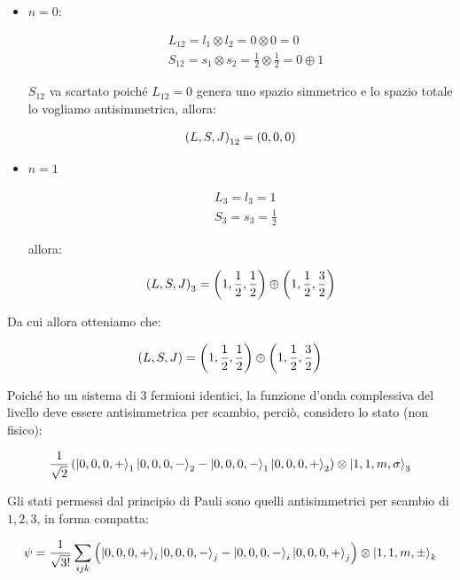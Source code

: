 \begin{itemize}
	\begin{itemize}
		\item $n = 0$:
		
		\begin{align*}
			& L_{12} = l_1 \otimes l_2 = 0 \otimes 0 = 0 \\
			& S_{12} = s_1 \otimes s_2 = \frac{1}{2} \otimes \frac{1}{2} = 0 \oplus 1
		\end{align*}
		
			$S_{12}$ va scartato poiché $L_{12} = 0$ genera uno spazio simmetrico e lo spazio totale lo vogliamo antisimmetrica, allora:
			
		\begin{align*}
			\qty(L, S, J)_{12} = \qty(0, 0, 0)
		\end{align*}

		\item $n = 1$
			
		\begin{align*}
			& L_3 = l_3 = 1\\
			& S_3 = s_3 = \frac{1}{2} 
		\end{align*}
			
			allora:
			
		\begin{align*}
			\qty(L, S, J)_3 = \qty(1, \frac{1}{2}, \frac{1}{2}) \oplus \qty(1, \frac{1}{2}, \frac{3}{2})
		\end{align*}
	\end{itemize}
	
		Da cui allora otteniamo che:
		
	\begin{align*}
		\qty(L, S, J) = \qty(1, \frac{1}{2}, \frac{1}{2}) \oplus \qty(1, \frac{1}{2}, \frac{3}{2})
	\end{align*}
	
		Poiché ho un sistema di $3$ fermioni identici, la funzione d'onda complessiva del livello deve essere antisimmetrica per scambio, perciò, considero lo stato (non fisico):
		
	\begin{align*}
		\frac{1}{\sqrt{2}} \, \qty(\ket{0, 0, 0, +}_1 \ket{0, 0, 0, -}_2 - \ket{0, 0, 0, -}_1 \ket{0, 0, 0, +}_2) \otimes \ket{1, 1, m, \sigma}_3
	\end{align*}

		Gli stati permessi dal principio di Pauli sono quelli antisimmetrici per scambio di $1, 2, 3$, in forma compatta:
		
	\begin{align*}
		\psi = \frac{1}{\sqrt{3!}} \sum_{ijk} \qty(\ket{0, 0, 0, +}_i \ket{0, 0, 0, -}_j - \ket{0, 0, 0, -}_i \ket{0, 0, 0, +}_j) \otimes \ket{1, 1, m, \pm}_k
	\end{align*}


\end{itemize}
